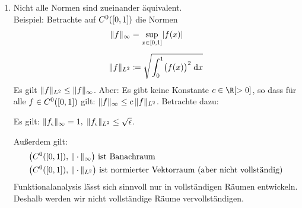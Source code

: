 \begin{thEmpty}
\begin{enumerate}[(1)]
    \item
        Nicht alle Normen sind zueinander äquivalent.\\
        Beispiel: Betrachte auf $C^0([0,1])$ die Normen
        \begin{align*}
            \lVert f\rVert_\infty &= \sup_{x\in[0,1]} \lvert f(x)\rvert  
            \\[1ex]
            \lVert f\rVert_{L^2} &\coloneqq \sqrt{ \int_0^1 \bigl(f(x)\bigr)^2 \;\mathrm{d} x }
        \end{align*}
        Es gilt $\lVert f\rVert_{L^2} \leq \lVert f\rVert_\infty$. Aber: Es gibt keine Konstante
        $c\in\R[>0]$, so dass für alle $f\in C^0([0,1])$ gilt: $\lVert f\rVert_\infty\leq
        c\,\lVert f\rVert_{L^2}$. Betrachte dazu:
        \begin{center}
            \pgfmathsetmacro{}
        \end{center}
        Es gilt: $\lVert f_\epsilon\rVert_\infty = 1,\; \lVert f_\epsilon\rVert_{L^2} \leq
        \sqrt{\epsilon}$.

        Außerdem gilt:
        \begin{align*}
            & \bigl( C^0([0,1]),\,\lVert\,\cdot\,\rVert_\infty \bigr)
            \text{ ist Banachraum}
            \\
            & \bigl( C^0([0,1]),\,\lVert\,\cdot\,\rVert_{L^2} \bigr)
            \text{ ist normierter Vektorraum (aber nicht vollständig)}
        \end{align*}
        Funktionalanalysis lässt sich sinnvoll nur in vollständigen Räumen
        entwickeln. Deshalb werden wir nicht vollständige Räume
        vervollständigen.
    \end{enumerate}
\end{thEmpty}


